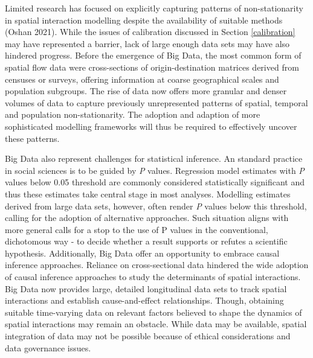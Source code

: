 \documentclass[11pt,letterpaper]{article}
\begin{document}
Limited research has focused on explicitly capturing patterns of non-stationarity in spatial interaction modelling despite the availability of suitable methods (Oshan 2021).
While the issues of calibration discussed in Section \ref{calibration} may have represented a barrier, lack of large enough data sets may have also hindered progress.
Before the emergence of Big Data, the most common form of spatial flow data were cross-sections of origin-destination matrices derived from censuses or surveys, offering information at coarse geographical scales and population subgroups.
The rise of data now offers more granular and denser volumes of data to capture previously unrepresented patterns of spatial, temporal and population non-stationarity.
The adoption and adaption of more sophisticated modelling frameworks will thus be required to effectively uncover these patterns.

Big Data also represent challenges for statistical inference.
An standard practice in social sciences is to be guided by \emph{P} values.
Regression model estimates with \emph{P} values below 0.05 threshold are commonly considered statistically significant and thus these estimates take central stage in most analyses.
Modelling estimates derived from large data sets, however, often render \emph{P} values below this threshold, calling for the adoption of alternative approaches.
Such situation aligns with more general calls for a stop to the use of P values in the conventional, dichotomous way - to decide whether a result supports or refutes a scientific hypothesis.
Additionally, Big Data offer an opportunity to embrace causal inference approaches.
Reliance on cross-sectional data hindered the wide adoption of causal inference approaches to study the determinants of spatial interactions.
Big Data now provides large, detailed longitudinal data sets to track spatial interactions and establish cause-and-effect relationships.
Though, obtaining suitable time-varying data on relevant factors believed to shape the dynamics of spatial interactions may remain an obstacle.
While data may be available, spatial integration of data may not be possible because of ethical considerations and data governance issues.
\end{document}
